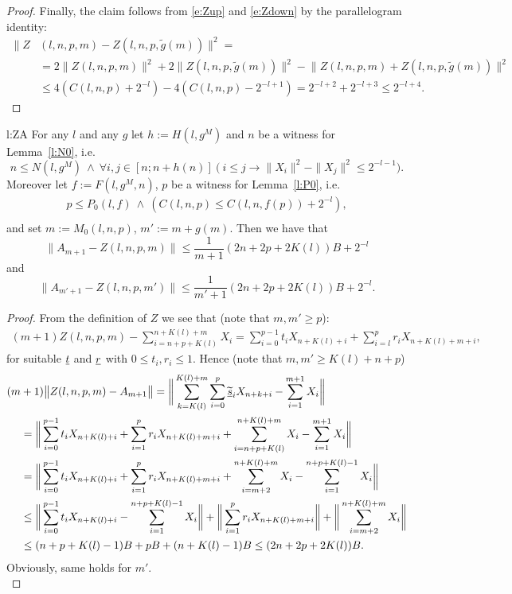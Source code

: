 \begin{proof}
Finally, the claim follows from \eqref{e:Zup}
and \eqref{e:Zdown} by the parallelogram identity:
\begin{align*}
\big\|Z&(l,n,p,m) - Z( l,n,p,\tilde g(m) ) \big\|^2 =\\ 
&=2\big\|Z( l,n,p,m)\big\|^2 + 2\big\|Z( l,n,p,\tilde g(m) )\big\|^2  - \big\|Z(l,n,p,m) + Z( l,n,p,\tilde g(m) )\big\|^2 \\
&\leq 4( C(l,n,p) + 2^{-l} ) - 4( C(l,n,p) - 2^{-l+1} ) = 2^{-l+2} + 2^{-l+3} \leq 2^{-l+4}.
\end{align*}
\end{proof}

\begin{lemma*}{l:ZA}
For any $l$ and any $g$ let $h:= H(l,g^M)$ and
$n$ be a witness for Lemma~\ref{l:N0}, i.e. 
\[
n\leq N(l,g^M)\ \wedge\ \forall i,j\in[n;n+h(n)]\ \big( \ i\leq j\rightarrow \|X_i\|^2-\|X_j\|^2\leq 2^{-l-1}\big). \tag{N}\label{e:N3}
\]
Moreover let $f:=F(l,g^M,n)$,
$p$ be a witness for Lemma~\ref{l:P0}, i.e. 
\begin{align*}
p\leq P_0(l,f)\ \wedge\ ( C(l,n,p)\leq C(l,n,f(p)) + 2^{-l}  ),  \tag{P}\label{e:P3}\\
\end{align*} 
and set $m:=M_0(l,n,p)$, $m':=m+g(m)$.
Then we have that
\[
 \big\|A_{m+1} - Z( l,n,p,m )\big\|\leq \frac{1}{m+1}(2n + 2p + 2K(l))B +2^{-l}
\]
and
\[
 \big\|A_{m'+1} - Z( l,n,p,m' )\big\|\leq \frac{1}{m'+1}(2n + 2p + 2K(l))B +2^{-l}.
\]
\end{lemma*}

\begin{proof}
From the definition of $Z$ we see that (note that $m,m'\geq p$):
\begin{align*}
(m+1)Z(l,n,p,m) - \sum^{n+K(l)+m}_{i=n+p+K(l)} X_{i} = 
\sum^{p-1}_{i=0} t_iX_{n+K(l)+i} + \sum^{p}_{i=l} r_iX_{n+K(l)+m+i},
\end{align*}
for suitable $\underline t$ and $\underline r$ with $0\leq t_i,r_i\leq 1$. Hence (note that $m,m'\geq K(l)+n+p$)
\begin{align*}
(m&+1)\big\|Z( l,n,p,m ) - A_{m+1}\big\| =
	 \bigg\| \sum^{K(l)+m}_{k=K(l)}\sum^{p}_{i=0}  \widetilde{\underline s}_i X_{n+k+i} - \sum^{m+1}_{i=1}X_i \bigg\|	\\
	 &=\bigg\| \sum^{p-1}_{i=0} t_iX_{n+K(l)+i} + \sum^{p}_{i=1} r_iX_{n+K(l)+m+i} + \sum^{n+K(l)+m}_{i=n+p+K(l)} X_{i} 
	      - \sum^{m+1}_{i=1}X_i \bigg\| \\
	 &= \bigg\| \sum^{p-1}_{i=0} t_iX_{n+K(l)+i} + \sum^{p}_{i=1} r_iX_{n+K(l)+m+i} + \sum^{n+K(l)+m}_{i=m+2} X_{i} - \sum^{n+p+K(l)-1}_{i=1} X_{i}  \bigg\| \\
	 &\leq \bigg\| \sum^{p-1}_{i=0} t_iX_{n+K(l)+i} - \sum^{n+p+K(l)-1}_{i=1} X_{i} \bigg\| + \bigg\|\sum^{p}_{i=1} r_iX_{n+K(l)+m+i} \bigg\| +  \bigg\| \sum^{n+K(l)+m}_{i=m+2} X_{i} \bigg\|  \\
	 &\leq (n+p+K(l)-1)B + pB + (n+K(l)-1)B \leq (2n + 2p + 2K(l))B.
\end{align*}
Obviously, same holds for $m'$.\\
\end{proof}
